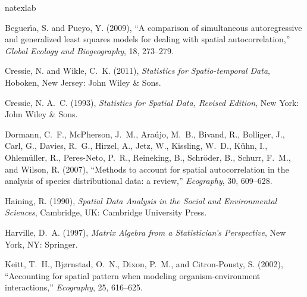 \documentclass[11pt, titlepage]{article}\usepackage[]{graphicx}\usepackage[]{color}
\begin{document}


%
%
\begin{thebibliography}{9}
\newcommand{\enquote}[1]{``#1''}
\expandafter\ifx\csname natexlab\endcsname\relax\def\natexlab#1{#1}\fi

Beguer{\'\i}a, S. and Pueyo, Y. (2009), \enquote{A comparison of simultaneous
  autoregressive and generalized least squares models for dealing with spatial
  autocorrelation,} \textit{Global Ecology and Biogeography}, 18, 273--279.

Cressie, N. and Wikle, C.~K. (2011), \textit{Statistics for Spatio-temporal
  Data}, Hoboken, New Jersey: John Wiley \& Sons.

Cressie, N. A.~C. (1993), \textit{Statistics for Spatial Data, Revised
  Edition}, New York: John Wiley \& Sons.

Dormann, C.~F., McPherson, J.~M., Ara{\'u}jo, M.~B., Bivand, R., Bolliger, J.,
  Carl, G., Davies, R.~G., Hirzel, A., Jetz, W., Kissling, W.~D., K{\"u}hn, I.,
  Ohlem{\"u}ller, R., Peres-Neto, P.~R., Reineking, B., Schr{\"o}der, B.,
  Schurr, F.~M., and Wilson, R. (2007), \enquote{Methods to account for spatial
  autocorrelation in the analysis of species distributional data: a review,}
  \textit{Ecography}, 30, 609--628.

Haining, R. (1990), \textit{Spatial Data Analysis in the Social and
  Environmental Sciences}, Cambridge, UK: Cambridge University Press.

Harville, D.~A. (1997), \textit{Matrix Algebra from a Statistician's
  Perspective}, New York, NY: Springer.

Keitt, T.~H., Bj{\o}rnstad, O.~N., Dixon, P.~M., and Citron-Pousty, S. (2002),
  \enquote{Accounting for spatial pattern when modeling organism-environment
  interactions,} \textit{Ecography}, 25, 616--625.


\end{thebibliography}
\end{document}
